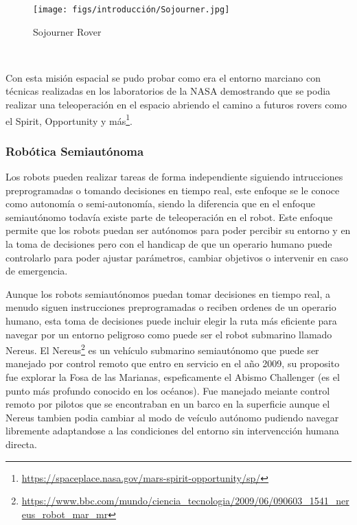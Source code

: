 \begin{figure} [H]
  \begin{center}
    \texttt{[image: figs/introducción/Sojourner.jpg]}
  \end{center}
  \caption{Sojourner Rover}
  \label{fig:Sojourner}
\end{figure}\

Con esta misión espacial se pudo probar como era el entorno marciano con técnicas realizadas en los laboratorios de la NASA demostrando que se podia realizar una teleoperación en 
el espacio abriendo el camino a futuros rovers como el Spirit, Opportunity y más\footnote{\url{https://spaceplace.nasa.gov/mars-spirit-opportunity/sp/}}. 

\subsubsection{Robótica Semiautónoma}
\label{sec:subseccion}
Los robots pueden realizar tareas de forma independiente siguiendo intrucciones preprogramadas o tomando decisiones en tiempo real, este enfoque se le conoce como autonomía o semi-autonomía, siendo la diferencia que en el enfoque semiautónomo todavía existe parte de teleoperación en el robot. Este enfoque permite que los robots puedan ser autónomos para poder
percibir su entorno y en la toma de decisiones pero con el handicap de que un operario humano puede controlarlo para poder ajustar parámetros, cambiar objetivos o intervenir 
en caso de emergencia. \newline

Aunque los robots semiautónomos puedan tomar decisiones en tiempo real, a menudo siguen instrucciones preprogramadas o reciben ordenes de un operario humano, esta toma de decisiones
puede incluir elegir la ruta más eficiente para navegar por un entorno peligroso como puede ser el robot submarino llamado Nereus. El Nereus\footnote{\url{https://www.bbc.com/mundo/ciencia_tecnologia/2009/06/090603_1541_nereus_robot_mar_mr}} 
es un vehículo submarino semiautónomo que puede ser manejado por control remoto que entro en servicio en el año 2009, su proposito fue explorar la Fosa de las Marianas, espeficamente el Abismo Challenger (es el punto más
profundo conocido en los océanos). Fue manejado meiante control remoto por pilotos que se encontraban en un barco en la superficie aunque el Nereus tambien podia cambiar al modo
de veículo autónomo pudiendo navegar libremente adaptandose a las condiciones del entorno sin intervencción humana directa. \newline


